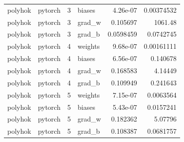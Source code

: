 \begin{tabular}{llrlrr}
polyhok & pytorch & 3 & biases & 4.26e-07 & 0.00374532 \\
polyhok & pytorch & 3 & grad\_w & 0.105697 & 1061.48 \\
polyhok & pytorch & 3 & grad\_b & 0.0598459 & 0.0742745 \\
polyhok & pytorch & 4 & weights & 9.68e-07 & 0.00161111 \\
polyhok & pytorch & 4 & biases & 6.56e-07 & 0.140678 \\
polyhok & pytorch & 4 & grad\_w & 0.168583 & 4.14449 \\
polyhok & pytorch & 4 & grad\_b & 0.109949 & 0.241643 \\
polyhok & pytorch & 5 & weights & 7.15e-07 & 0.0063564 \\
polyhok & pytorch & 5 & biases & 5.43e-07 & 0.0157241 \\
polyhok & pytorch & 5 & grad\_w & 0.182362 & 5.07796 \\
polyhok & pytorch & 5 & grad\_b & 0.108387 & 0.0681757 \\
\hline
\end{tabular}
